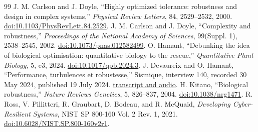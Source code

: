 \documentclass[10pt]{article}
\begin{document}
\begin{thebibliography}{99}\small
\setlength{\baselineskip}{9.5pt}
\setlength{\itemsep}{0pt}
\setlength{\parsep}{0pt}
 J. M. Carlson and J. Doyle, ``Highly optimized tolerance: robustness and design in complex systems,'' \emph{Physical Review Letters}, 84, 2529--2532, 2000. \href{https://doi.org/10.1103/PhysRevLett.84.2529}{doi:10.1103/PhysRevLett.84.2529}.
 J. M. Carlson and J. Doyle, ``Complexity and robustness,'' \emph{Proceedings of the National Academy of Sciences}, 99(Suppl. 1), 2538--2545, 2002. \href{https://doi.org/10.1073/pnas.012582499}{doi:10.1073/pnas.012582499}.
 O. Hamant, ``Debunking the idea of biological optimisation: quantitative biology to the rescue,'' \emph{Quantitative Plant Biology}, 5, e3, 2024. \href{https://doi.org/10.1017/qpb.2024.3}{doi:10.1017/qpb.2024.3}.
 J. Devaureix and O. Hamant, ``Performance, turbulences et robustesse,'' Sismique, interview 140, recorded 30 May 2024, published 19 July 2024. \href{https://www.sismique.fr/episodes/140-performance-turbulences-et-robustesse-olivier-hamant}{transcript and audio}.
 H. Kitano, ``Biological robustness,'' \emph{Nature Reviews Genetics}, 5, 826--837, 2004. \href{https://doi.org/10.1038/nrg1471}{doi:10.1038/nrg1471}.
 R. Ross, V. Pillitteri, R. Graubart, D. Bodeau, and R. McQuaid, \emph{Developing Cyber-Resilient Systems}, NIST SP 800-160 Vol. 2 Rev. 1, 2021. \href{https://doi.org/10.6028/NIST.SP.800-160v2r1}{doi:10.6028/NIST.SP.800-160v2r1}.
\end{thebibliography}
\end{document}
